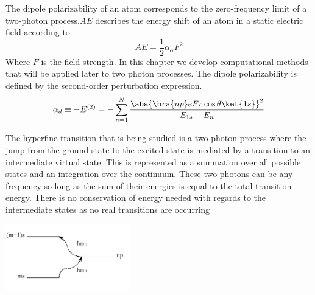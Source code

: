 The dipole polarizability of an atom corresponds to the zero-frequency limit of a two-photon process.\(AE\) describes the energy shift of an atom in a static electric field according to
\begin{equation}
    AE = \frac{1}{2}\alpha_\alpha F^2
\end{equation}
Where \(F\) is the field strength. In this chapter we develop computational methods that will be applied later to two photon processes. The dipole polarizability is defined by the second-order perturbation expression\cite{variational}.
\begin{equation}
    \alpha_{d}\equiv- E^{(2)}=-\sum_{n=1}^{N}\frac{\abs{\bra{np}eFr\cos{\theta}\ket{1s}}^{2}}{E_{1s}-E_{n}}
\end{equation}

The hyperfine transition that is being studied is a two photon process where the jump from the ground state to the excited state is mediated by a transition to an intermediate virtual state. This is represented as a summation over all possible states and an integration over the continuum. These two photons can be any frequency so long as the sum of their energies is equal to the total transition energy\cite{loudon}. There is no conservation of energy needed with regards to the intermediate states as no real transitions are occurring\cite{loudon}

\begin{center}

        \includegraphics[width=0.4\textwidth]{images/transitioncrop.PNG}

\end{center}
        
